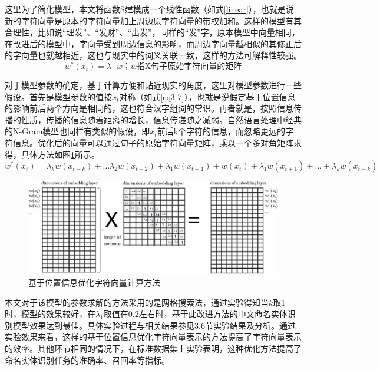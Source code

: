 \documentclass[winfonts,master,oneside,nobackinfo]{njuthesis}
\begin{document}
这里为了简化模型，本文将函数S建模成一个线性函数（如式\ref{linear}），也就是说新的字符向量是原本的字符向量加上周边原字符向量的带权加和。这样的模型有其合理性，比如说“理发”、“发财”、“出发”，同样的“发”字，原本模型中向量相同，在改进后的模型中，字向量受到周边信息的影响，而周边字向量越相似的其修正后的字向量也就越相近，这也与现实中的词义关联一致，这样的方法可解释性较强。
\begin{equation}
w^{*}\left(x_{t}\right)=\lambda \cdot w \mbox{；} w \mbox{指X句子原始字符向量的矩阵}
\label{linear}
\end{equation}

对于模型参数的确定，基于计算方便和贴近现实的角度，这里对模型参数进行一些假设。首先是模型参数的值按$x_{t}$对称（如式\ref{eq3-7}），也就是说假定基于位置信息的影响前后两个方向是相同的，这也符合汉字组词的常识。再者就是，按照信息传播的性质，传播的信息随着距离的增长，信息传递随之减弱。自然语言处理中经典的N-Gram模型也同样有类似的假设，即$x_{t}$前后k个字符的信息，而忽略更远的字符信息。优化后的向量可以通过句子的原始字符向量矩阵，乘以一个多对角矩阵求得，具体方法如图\ref{modify-site}所示。
\begin{equation}
w^{*}\left(x_{t}\right)=\lambda_{k} w\left(x_{t-k}\right)+\ldots \lambda_{2}w\left(x_{t-2}\right)+\lambda_{1} w\left(x_{t-1}\right)+ w\left(x_{t}\right)+\lambda_{1} w\left(x_{t+1}\right)+\ldots+\lambda_{k} w\left(x_{t+k}\right)
\label{eq3-7}
\end{equation}
\begin{figure}[h]
\centering
\includegraphics[width=1\textwidth]{./figure/基于位置信息变化.jpg}
\caption{基于位置信息优化字符向量计算方法}
\label{modify-site}
\end{figure}

本文对于该模型的参数求解的方法采用的是网格搜索法，通过实验得知当$k$取1时，模型的效果较好，在$\lambda_{1}$取值在0.2左右时，基于此改进方法的中文命名实体识别模型效果达到最佳。具体实验过程与相关结果参见3.6节实验结果及分析。通过实验效果来看，这样的基于位置信息优化字符向量表示的方法提高了字符向量表示的效率。其他环节相同的情况下，在标准数据集上实验表明，这种优化方法提高了命名实体识别任务的准确率、召回率等指标。
\end{document}
